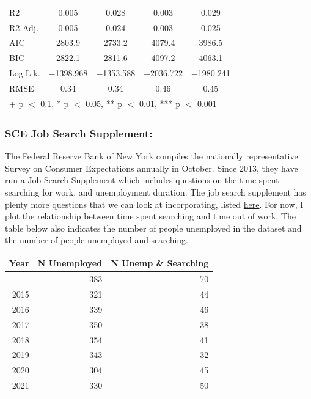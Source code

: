 \documentclass[
]{article}
\begin{document}
\begin{table}
\begin{tabular}[t]{lcccc}
R2 & \num{0.005} & \num{0.028} & \num{0.003} & \num{0.029}\\
R2 Adj. & \num{0.005} & \num{0.024} & \num{0.003} & \num{0.025}\\
AIC & \num{2803.9} & \num{2733.2} & \num{4079.4} & \num{3986.5}\\
BIC & \num{2822.1} & \num{2811.6} & \num{4097.2} & \num{4063.1}\\
Log.Lik. & \num{-1398.968} & \num{-1353.588} & \num{-2036.722} & \num{-1980.241}\\
RMSE & \num{0.34} & \num{0.34} & \num{0.46} & \num{0.45}\\
\bottomrule
\multicolumn{5}{l}{\rule{0pt}{1em}+ p $<$ 0.1, * p $<$ 0.05, ** p $<$ 0.01, *** p $<$ 0.001}\\
\end{tabular}
\end{table}

\subsubsection{SCE Job Search
Supplement:}\label{sce-job-search-supplement}

The Federal Reserve Bank of New York compiles the nationally
representative Survey on Consumer Expectations annually in October.
Since 2013, they have run a Job Search Supplement which includes
questions on the time spent searching for work, and unemployment
duration. The job search supplement has plenty more questions that we
can look at incorporating, listed
\href{https://www.newyorkfed.org/medialibrary/Interactives/sce/sce/downloads/data/SCE-Labor-Market-Survey-Data-Codebook.pdf?sc_lang=en}{here}.
For now, I plot the relationship between time spent searching and time
out of work. The table below also indicates the number of people
unemployed in the dataset and the number of people unemployed and
searching.

\begin{longtable}[]{@{}rrr@{}}
\toprule\noalign{}
Year & N Unemployed & N Unemp \& Searching \\
\midrule\noalign{}
\endhead
\bottomrule\noalign{}
\endlastfoot
2014 & 383 & 70 \\
2015 & 321 & 44 \\
2016 & 339 & 46 \\
2017 & 350 & 38 \\
2018 & 354 & 41 \\
2019 & 343 & 32 \\
2020 & 304 & 45 \\
2021 & 330 & 50 \\
\end{longtable}
\end{document}
